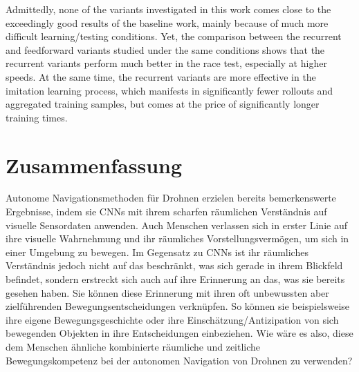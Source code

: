 Admittedly, none of the variants investigated in this work 
comes close to the exceedingly good results of the baseline work, 
mainly because of much more difficult learning/testing conditions. 
Yet, the comparison between the recurrent and feedforward variants 
studied under the same conditions shows that the recurrent variants 
perform much better in the race test, especially at higher speeds. 
At the same time, the recurrent variants are more effective in the imitation learning process, 
which manifests in significantly fewer rollouts and aggregated training samples, 
but comes at the price of significantly longer training times.


\newpage
\chapter*{Zusammenfassung}

Autonome Navigationsmethoden f{\"u}r Drohnen erzielen bereits bemerkenswerte Ergebnisse, 
indem sie CNNs mit ihrem scharfen r{\"a}umlichen Verst{\"a}ndnis auf visuelle Sensordaten anwenden. 
Auch Menschen verlassen sich in erster Linie auf ihre visuelle Wahrnehmung 
und ihr r{\"a}umliches Vorstellungsverm{\"o}gen, um sich in einer Umgebung zu bewegen. 
Im Gegensatz zu CNNs ist ihr r{\"a}umliches Verst{\"a}ndnis jedoch nicht auf das beschr{\"a}nkt, 
was sich gerade in ihrem Blickfeld befindet, sondern erstreckt sich auch auf ihre Erinnerung 
an das, was sie bereits gesehen haben. Sie k{\"o}nnen diese Erinnerung 
mit ihren oft unbewussten aber zielf{\"u}hrenden Bewegungsentscheidungen verkn{\"u}pfen. 
So k{\"o}nnen sie beispielsweise ihre eigene Bewegungsgeschichte 
oder ihre Einsch{\"a}tzung/Antizipation
von sich bewegenden Objekten in ihre Entscheidungen einbeziehen. 
Wie w{\"a}re es also, diese dem Menschen {\"a}hnliche 
kombinierte r{\"a}umliche und zeitliche Bewegungskompetenz 
bei der autonomen Navigation von Drohnen zu verwenden?

